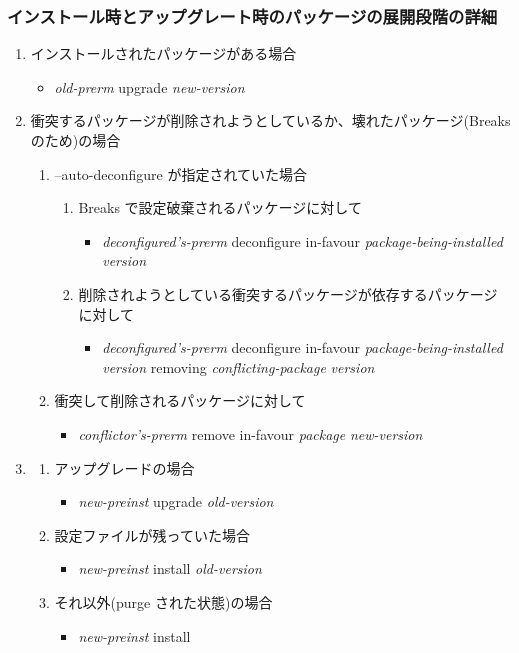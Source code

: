 \documentclass[mingoth,a4paper]{jsarticle}
\begin{document}
\subsubsection{インストール時とアップグレート時のパッケージの展開段階の詳細}
\begin{enumerate}

\item インストールされたパッケージがある場合
  \begin{itemize}
  \item {\it old-prerm} upgrade {\it new-version}
  \end{itemize}

\item 衝突するパッケージが削除されようとしているか、壊れたパッケージ(Breaks のため)の場合
  \begin{enumerate}
  \item --auto-deconfigure が指定されていた場合
    \begin{enumerate}
    \item Breaks で設定破棄されるパッケージに対して
      \begin{itemize}
      \item {\it deconfigured's-prerm} deconfigure in-favour {\it package-being-installed} {\it version}
      \end{itemize}
    \item 削除されようとしている衝突するパッケージが依存するパッケージに対して
      \begin{itemize}
      \item {\it deconfigured's-prerm} deconfigure in-favour {\it package-being-installed} {\it version} removing {\it conflicting-package} {\it version}
      \end{itemize}
    \end{enumerate}
  \item 衝突して削除されるパッケージに対して
    \begin{itemize}
    \item {\it conflictor's-prerm} remove in-favour {\it package} {\it new-version}
    \end{itemize}
  \end{enumerate}

\item
  \begin{enumerate}
  \item アップグレードの場合
    \begin{itemize}
    \item {\it new-preinst} upgrade {\it old-version}
    \end{itemize}
  \item 設定ファイルが残っていた場合
    \begin{itemize}
    \item {\it new-preinst} install {\it old-version}
    \end{itemize}
  \item それ以外(purge された状態)の場合
    \begin{itemize}
    \item {\it new-preinst} install
    \end{itemize}
  \end{enumerate}


\end{enumerate}
\end{document}
